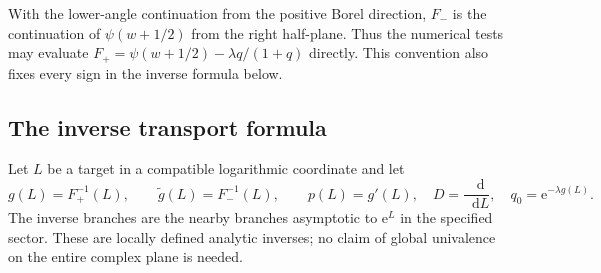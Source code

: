 \documentclass[11pt,a4paper]{article}
\theoremstyle{definition}
\numberwithin{equation}{section}
\newcommand{\dd}{\mathop{}\!\mathrm{d}}
\newcommand{\ee}{\mathrm{e}}
\begin{document}
With the lower-angle continuation from the positive Borel direction, $F_-$ is the continuation of $\psi(w+1/2)$ from the right half-plane. Thus the numerical tests may evaluate
$F_+=\psi(w+1/2)-\lambda q/(1+q)$ directly. This convention also fixes every sign in the inverse formula below.

\subsection{The inverse transport formula}
Let $L$ be a target in a compatible logarithmic coordinate and let
\begin{equation}
 g(L)=F_+^{-1}(L),\qquad
 \widetilde g(L)=F_-^{-1}(L),\qquad
 p(L)=g'(L),\quad D=\frac{\dd}{\dd L},\quad
 q_0=\ee^{-\lambda g(L)}.
 \label{eq:stokes-notation}
\end{equation}
The inverse branches are the nearby branches asymptotic to $\ee^L$ in the specified sector. These are locally defined analytic inverses; no claim of global univalence on the entire complex plane is needed.
\end{document}
